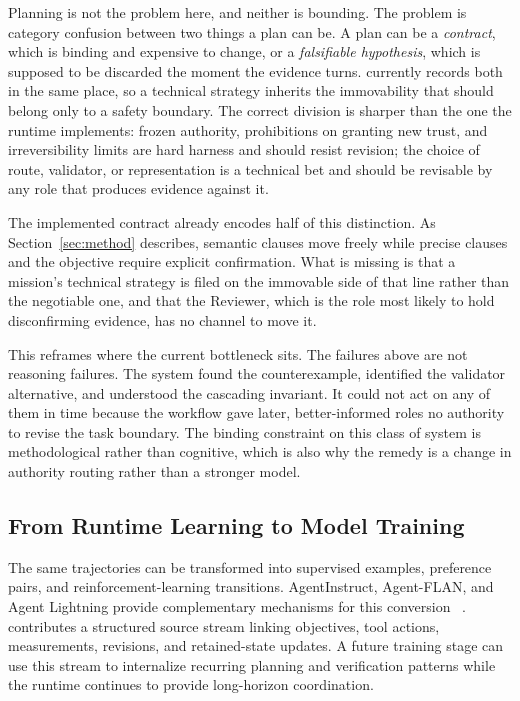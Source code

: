 Planning is not the problem here, and neither is bounding. The problem is category
confusion between two things a plan can be. A plan can be a \emph{contract}, which is
binding and expensive to change, or a \emph{falsifiable hypothesis}, which is
supposed to be discarded the moment the evidence turns. \systemname currently records
both in the same place, so a technical strategy inherits the immovability that should
belong only to a safety boundary. The correct division is sharper than the one the
runtime implements: frozen authority, prohibitions on granting new trust, and
irreversibility limits are hard harness and should resist revision; the choice of
route, validator, or representation is a technical bet and should be revisable by any
role that produces evidence against it.

The implemented contract already encodes half of this distinction. As
Section~\ref{sec:method} describes, semantic clauses move freely while precise
clauses and the objective require explicit confirmation. What is missing is that a
mission's technical strategy is filed on the immovable side of that line rather than
the negotiable one, and that the Reviewer, which is the role most likely to hold
disconfirming evidence, has no channel to move it.

This reframes where the current bottleneck sits. The failures above are not reasoning
failures. The system found the counterexample, identified the validator alternative,
and understood the cascading invariant. It could not act on any of them in time
because the workflow gave later, better-informed roles no authority to revise the task
boundary. The binding constraint on this class of system is methodological rather than
cognitive, which is also why the remedy is a change in authority routing rather than a
stronger model.

\subsection{From Runtime Learning to Model Training}

The same trajectories can be transformed into supervised examples, preference
pairs, and reinforcement-learning transitions. AgentInstruct, Agent-FLAN, and
Agent Lightning provide complementary mechanisms for this conversion
~\citep{mitra2024agentinstruct,chen2024agentflan,luo2025agentlightning}.
\systemname contributes a structured source stream linking objectives, tool actions,
measurements, revisions, and retained-state updates. A future training stage can use
this stream to internalize recurring planning and verification patterns while the
runtime continues to provide long-horizon coordination.

